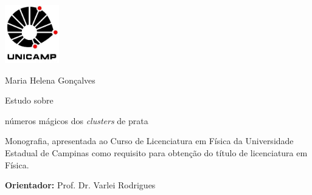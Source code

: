\pagestyle{plain}
\vspace{-5cm}
\includegraphics[width=.94\textwidth, height=1in,
keepaspectratio=true]{logos/logo_Unicamp}

\begin{center}
{\Large {\Large Maria Helena Gonçalves}\\

\vspace{0.5cm}
}

\vspace{0.5cm}
 
\vspace{3cm}
{\huge Estudo sobre

\bigskip

números mágicos dos \textit{clusters} de prata}

\vspace{2.5cm}

\end{center}

\begin{flushright}
  \begin{minipage}[c]{.5\textwidth}
        Monografia, apresentada ao Curso de Licenciatura em Física da Universidade Estadual de Campinas como requisito para obtenção do título de licenciatura em Física.
        
        \vspace{.2cm}
        \textbf{Orientador:} Prof. Dr. Varlei Rodrigues
    
  \end{minipage}
\end{flushright}

\begin{center}



\vspace{2.7cm}







\end{center}

\vspace{1cm}

\begin{center}

 \\
 \\

\end{center}

\newpage

$ $

\newpage
